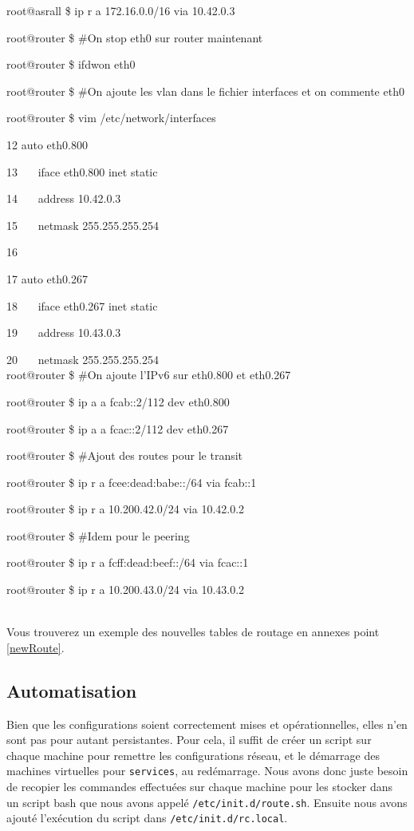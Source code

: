 {\begin{minipage}{0.9\textwidth}
				root@asrall \$ ip r a 172.16.0.0/16 via 10.42.0.3

				root@router \$ \#On stop eth0 sur router maintenant

				root@router \$ ifdwon eth0
				
				root@router \$ \#On ajoute les vlan dans le fichier interfaces et on commente eth0

				root@router \$ vim /etc/network/interfaces

				\color{yellow}12 \color{white} auto eth0.800

				\color{yellow}13 \color{white} ~~~iface eth0.800 inet static

				\color{yellow}14 \color{white} ~~~address 10.42.0.3

				\color{yellow}15 \color{white} ~~~netmask 255.255.255.254

				\color{yellow}16 \color{white}

				\color{yellow}17 \color{white} auto eth0.267

				\color{yellow}18 \color{white} ~~~iface eth0.267 inet static

				\color{yellow}19 \color{white} ~~~address 10.43.0.3

				\color{yellow}20 \color{white} ~~~netmask 255.255.255.254\\

				root@router \$ \#On ajoute l'IPv6 sur eth0.800 et eth0.267

				root@router \$ ip a a fcab::2/112 dev eth0.800

				root@router \$ ip a a fcac::2/112 dev eth0.267

				root@router \$ \#Ajout des routes pour le transit

				root@router \$ ip r a fcee:dead:babe::/64 via fcab::1

				root@router \$ ip r a 10.200.42.0/24 via 10.42.0.2

				root@router \$ \#Idem pour le peering

				root@router \$ ip r a fcff:dead:beef::/64 via fcac::1

				root@router \$ ip r a 10.200.43.0/24 via 10.43.0.2
			\color{black}
			\end{minipage}
		}
		\\

		Vous trouverez un exemple des nouvelles tables de routage en annexes point \ref{newRoute}.

		\subsection{Automatisation}
			\vspace{0.3cm}
			Bien que les configurations soient correctement mises et opérationnelles, elles n'en sont pas pour autant persistantes. Pour cela, il suffit de créer un script sur chaque machine pour remettre les configurations réseau, et le démarrage des machines virtuelles pour \verb?services?, au redémarrage. Nous avons donc juste besoin de recopier les commandes effectuées sur chaque machine pour les stocker dans un script bash que nous avons appelé \verb?/etc/init.d/route.sh?. Ensuite nous avons ajouté l'exécution du script dans \verb?/etc/init.d/rc.local?.

\newpage
